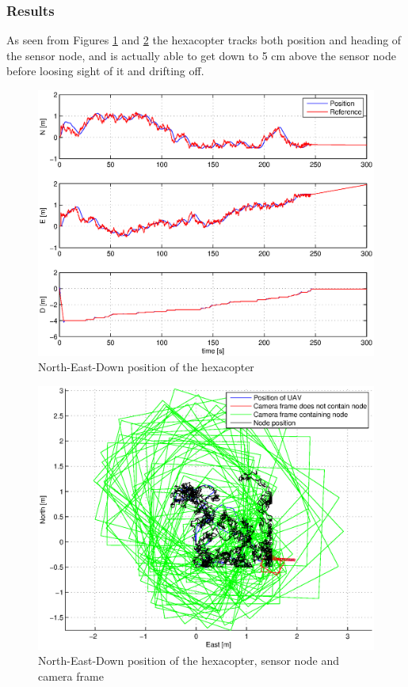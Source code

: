 \subsubsection{Results}
As seen from Figures \ref{posNodeDisturbance} and \ref{posFrameNodeDisturbance} the hexacopter tracks both position and heading of the sensor node, and is actually able to get down to 5 cm above the sensor node before loosing sight of it and drifting off.
\begin{figure}[H]
\centering
\includegraphics[width = 12cm]{fig/plots/simulation/positionNodeDisturbance.eps}
\caption{North-East-Down position of the hexacopter}
\label{posNodeDisturbance}
\end{figure}
\begin{figure}[H]
\centering
\includegraphics[width = 12cm]{fig/plots/simulation/positionFrameNodeDisturbance.eps}
\caption{North-East-Down position of the hexacopter, sensor node and camera frame} 
\label{posFrameNodeDisturbance}
\end{figure}
